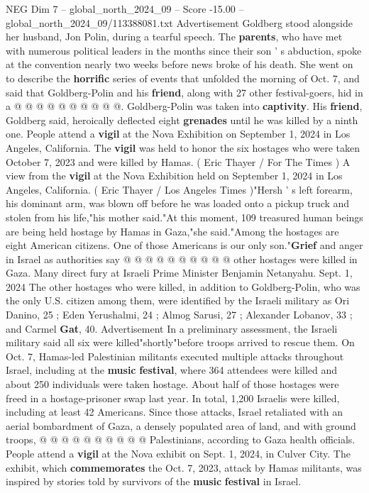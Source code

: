\begin{textsample}{NEG Dim 7 – global\_north\_2024\_09 – Score -15.00 – global\_north\_2024\_09/113388081.txt}
Advertisement Goldberg stood alongside her husband, Jon Polin, during a tearful speech.
The \textbf{parents}, who have met with numerous political leaders in the months since their son ' s abduction, spoke at the convention nearly two weeks before news broke of his death.
She went on to describe the \textbf{horrific} series of events that unfolded the morning of Oct. 7, and said that Goldberg-Polin and his \textbf{friend}, along with 27 other festival-goers, hid in a @ @ @ @ @ @ @ @ @ @.
Goldberg-Polin was taken into \textbf{captivity}.
His \textbf{friend}, Goldberg said, heroically deflected eight \textbf{grenades} until he was killed by a ninth one.
People attend a \textbf{vigil} at the Nova Exhibition on September 1, 2024 in Los Angeles, California.
The \textbf{vigil} was held to honor the six hostages who were taken October 7, 2023 and were killed by Hamas. ( Eric Thayer / For The Times ) A view from the \textbf{vigil} at the Nova Exhibition held on September 1, 2024 in Los Angeles, California. ( Eric Thayer / Los Angeles Times )"Hersh ' s left forearm, his dominant arm, was blown off before he was loaded onto a pickup truck and stolen from his life,"his mother said."At this moment, 109 treasured human beings are being held hostage by Hamas in Gaza,"she said."Among the hostages are eight American citizens.
One of those Americans is our only son."\textbf{Grief} and anger in Israel as authorities say @ @ @ @ @ @ @ @ @ @ other hostages were killed in Gaza.
Many direct fury at Israeli Prime Minister Benjamin Netanyahu.
Sept. 1, 2024 The other hostages who were killed, in addition to Goldberg-Polin, who was the only U.S. citizen among them, were identified by the Israeli military as Ori Danino, 25 ; Eden Yerushalmi, 24 ; Almog Sarusi, 27 ; Alexander Lobanov, 33 ; and Carmel \textbf{Gat}, 40.
Advertisement In a preliminary assessment, the Israeli military said all six were killed"shortly"before troops arrived to rescue them.
On Oct. 7, Hamas-led Palestinian militants executed multiple attacks throughout Israel, including at the \textbf{music} \textbf{festival}, where 364 attendees were killed and about 250 individuals were taken hostage.
About half of those hostages were freed in a hostage-prisoner swap last year.
In total, 1,200 Israelis were killed, including at least 42 Americans.
Since those attacks, Israel retaliated with an aerial bombardment of Gaza, a densely populated area of land, and with ground troops, @ @ @ @ @ @ @ @ @ @ Palestinians, according to Gaza health officials.
People attend a \textbf{vigil} at the Nova exhibit on Sept. 1, 2024, in Culver City.
The exhibit, which \textbf{commemorates} the Oct. 7, 2023, attack by Hamas militants, was inspired by stories told by survivors of the \textbf{music} \textbf{festival} in Israel.

\end{textsample}
